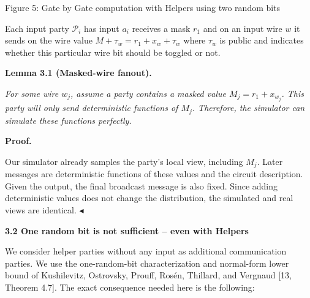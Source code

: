 \documentclass[10pt,a4paper]{article}
\begin{document}
Figure 5: Gate by Gate computation with Helpers using two random bits



Each input party $\mathcal{P}_{i}$ has input $a_{i}$ receives a mask $r_{1}$ and on an input wire $w$ it sends on the wire value $M+\tau_{w}=r_{1}+x_{w}+\tau_{w}$
where $\tau_{w}$ is public and indicates whether this particular wire bit should be toggled or not.\par





\par\medskip\noindent\textbf{
\textbf{Lemma 3.1}\textbf{ }(Masked-wire fanout)\textbf{.}
}\par



\emph{For some wire $w_{j}$, assume a party contains a masked value
$M_{j}=r_{1}+x_{w_{j}}$.
This party will only send deterministic functions of $M_{j}$. Therefore, the simulator can simulate these functions perfectly.}\par






\par\medskip\noindent\textbf{Proof.}\par




Our simulator already samples the party’s local view, including
$M_{j}$. Later messages are deterministic functions of these values
and the circuit description. Given the output, the final broadcast message is also fixed.
Since adding deterministic values does not change the distribution, the
simulated and real views are identical.
$\blacktriangleleft$\par






\par\medskip\noindent\textbf{
3.2 One random bit is not sufficient – even with Helpers}\par




We consider helper parties without any input as additional communication parties. We use the one-random-bit characterization and normal-form lower bound of Kushilevitz, Ostrovsky, Prouff, Rosén, Thillard, and Vergnaud [13, Theorem 4.7]. The exact consequence needed here is the following:\par
\end{document}

